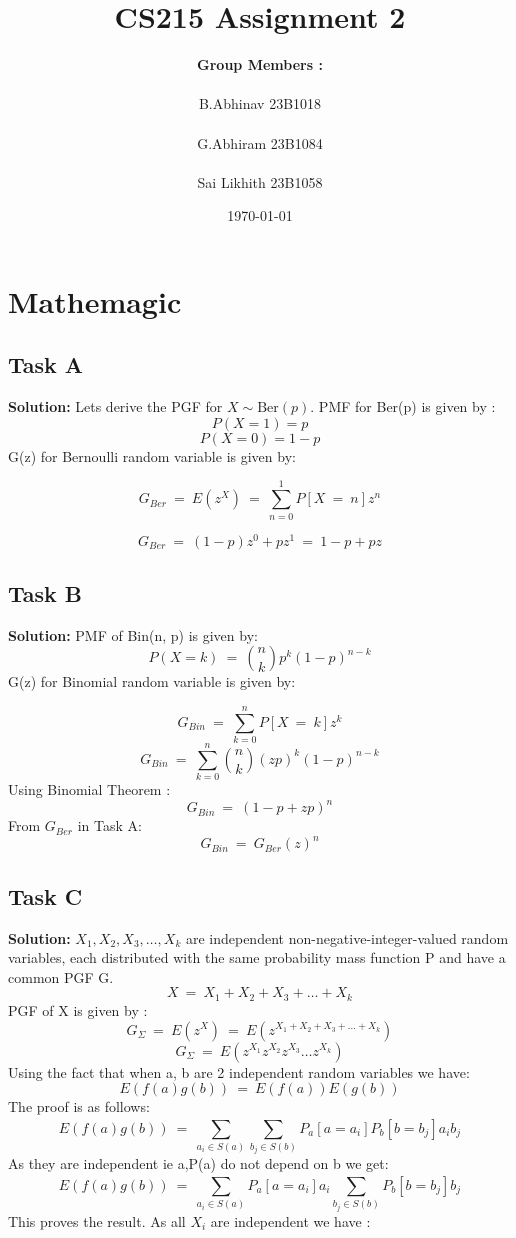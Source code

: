 \documentclass[12pt]{article}
\title{\Huge\textbf{CS215 Assignment 2}}
\author{\Large\textbf{ Group Members :} \\ \\ 
    \large B.Abhinav  23B1018 \\ \\ 
    \large G.Abhiram  23B1084 \\ \\
    \large Sai Likhith 23B1058 
}
\date{\today}
\begin{document}
\maketitle
\newpage

\tableofcontents
\newpage

\section{Mathemagic}
\subsection{Task A}
\textbf{Solution: } \newline
Lets derive the PGF for $X \sim \text{Ber}(p)$. PMF for Ber(p) is given by :
\[P(X=1) = p\]
\[P(X=0) = 1-p\]
G(z) for Bernoulli random variable is given by:

\[G_{Ber}\ =\ E(z^X)\ =\ \sum_{n=0}^{1}P[X\ =\ n]z^n \]

\begin{equation}
    G_{Ber}\ =\ (1-p)z^0+pz^1\ =\ 1-p+pz
\end{equation}

\subsection{Task B}
\textbf{Solution: } \newline
PMF of Bin(n, p) is given by: 
\[P(X=k)\ =\ \binom{n}{k}p^k(1-p)^{n-k}\]
G(z) for Binomial random variable is given by:

\[G_{Bin}\ =\ \sum_{k=0}^nP[X\ =\ k]z^k\]
\[G_{Bin}\ =\ \sum_{k=0}^n\binom{n}{k}(zp)^k(1-p)^{n-k}\]
Using Binomial Theorem :
\[G_{Bin}\ =\ (1-p+zp)^{n}\]
From $G_{Ber}$ in Task A:
\begin{equation}
    G_{Bin}\ =\ G_{Ber}(z)^n
\end{equation}

\subsection{Task C}
\textbf{Solution: } \newline
$X_1,X_2,X_3,\dots,X_k$ are independent non-negative-integer-valued random variables, each distributed with the same probability mass function P and have a common PGF G.
\[X\ =\ X_1+X_2+X_3+\dots+X_k\]
PGF of X is given by :
\[G_{\Sigma}\ =\ E(z^X)\ =\ E(z^{X_1+X_2+X_3+\dots+X_k})\]
\[G_{\Sigma}\ =\ E(z^{X_1}z^{X_2}z^{X_3}\dots z^{X_k})\]
Using the fact that when a, b are 2 independent random variables we have:
\begin{equation}
    E(f(a)g(b))\ =\ E(f(a))E(g(b))
\end{equation}
The proof is as follows:
\[E(f(a)g(b))\ =\ \sum_{a_i\in S(a)}^{}\sum_{b_j\in S(b)}^{}P_a[a=a_i]P_b[b=b_j]a_ib_j\]
As they are independent ie a,P(a) do not depend on b we get:
\[E(f(a)g(b))\ =\ \sum_{a_i\in S(a)}^{}P_a[a=a_i]a_i\sum_{b_j\in S(b)}^{}P_b[b=b_j]b_j\]
This proves the result.
As all $X_i$ are independent we have :
\end{document}
